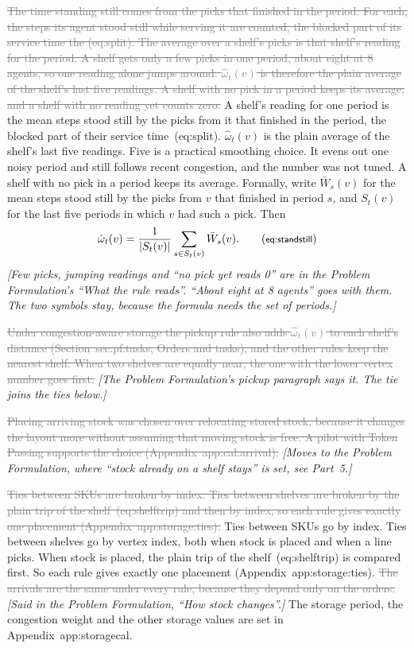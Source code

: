 \documentclass[11pt,a4paper]{article}
\newcommand{\new}[1]{\textcolor{newc}{#1}}
\newcommand{\old}[1]{\textcolor{gray}{\sout{#1}}}
\newcommand{\note}[1]{{\small\itshape [#1]}}
\newcommand{\lab}[1]{\textsf{\footnotesize #1}}
\renewcommand{\ref}[1]{\lab{#1}}
\renewcommand{\eqref}[1]{(\lab{#1})}
\newcommand{\nref}[1]{the (\lab{#1})}
\begin{document}
\old{The time standing still comes from the picks that finished in the
period. For each, the steps its agent stood still while serving it are
counted, the blocked part of its service time \nref{eq:split}. The average
over a shelf's picks is that shelf's reading for the period. A shelf gets
only a few picks in one period, about eight at 8 agents, so one reading
alone jumps around. $\hat\omega_t(v)$ is therefore the plain average of the
shelf's last five readings. A shelf with no pick in a period keeps its
average, and a shelf with no reading yet counts zero.}
\new{A shelf's reading for one period is the mean steps stood still by the
picks from it that finished in the period, the blocked part of their
service time~\eqref{eq:split}. $\hat\omega_t(v)$ is the plain average of
the shelf's last five readings. Five is a practical smoothing choice. It
evens out one noisy period and still follows recent congestion, and the
number was not tuned. A shelf with no pick in a period keeps its average.}
Formally, write $\bar W_s(v)$ for the mean steps stood still by the picks
from $v$ that finished in period $s$, and $S_t(v)$ for the last five
periods in which $v$ had such a pick. Then
\begin{equation*}
  \hat\omega_t(v) = \frac{1}{|S_t(v)|}\sum_{s \in S_t(v)} \bar W_s(v) .
  \tag{\lab{eq:standstill}}
\end{equation*}
\note{Few picks, jumping readings and ``no pick yet reads 0'' are in the
Problem Formulation's ``What the rule reads''. ``About eight at 8 agents''
goes with them. The two symbols stay, because the formula needs the set of
periods.}

\old{Under congestion-aware storage the pickup rule also adds
$\hat\omega_t(v)$ to each shelf's distance (Section~\ref{sec:pf:tasks},
Orders and tasks), and the other rules keep the nearest shelf. When two
shelves are equally near, the one with the lower vertex number goes first.}
\note{The Problem Formulation's pickup paragraph says it. The tie joins
the ties below.}

\old{Placing arriving stock was chosen over relocating stored stock, because
it changes the layout more without assuming that moving stock is free. A
pilot with Token Passing supports the choice
(Appendix~\ref{app:cal:arrival}).} \note{Moves to the Problem Formulation,
where ``stock already on a shelf stays'' is set, see Part~5.}

\old{Ties between SKUs are broken by index. Ties between shelves are broken
by the plain trip of the shelf~\eqref{eq:shelftrip} and then by index, so
each rule gives exactly one placement (Appendix~\ref{app:storage:ties}).}
\new{Ties between SKUs go by index. Ties between shelves go by vertex index,
both when stock is placed and when a line picks. When stock is placed, the
plain trip of the shelf~\eqref{eq:shelftrip} is compared first. So each rule
gives exactly one placement (Appendix~\ref{app:storage:ties}).}
\old{The arrivals are the same under every rule, because they depend only on
the orders.} \note{Said in the Problem Formulation, ``How stock changes''.}
The storage period, the congestion weight and the other storage values are
set in Appendix~\ref{app:storagecal}.
\end{document}
